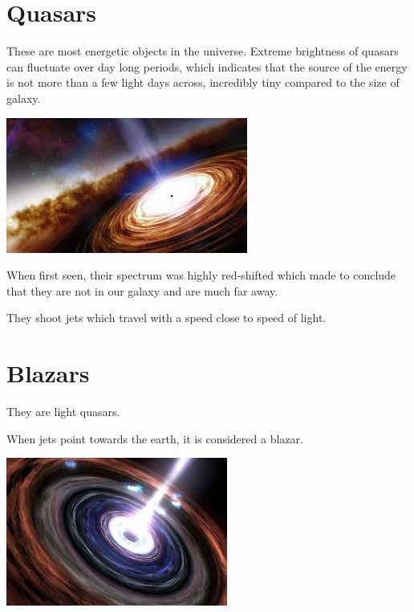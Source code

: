 \documentclass{book}
\begin{document}
\section{Quasars}
These are most energetic objects in the universe.
Extreme brightness of quasars can fluctuate over day long periods, which indicates that the source of the energy is not more than a few light days across, incredibly tiny compared to the size of galaxy.


\includegraphics{quasar.jpeg}


When first seen, their spectrum was highly red-shifted which made to conclude that they are not in our galaxy and are much far away.

They shoot jets which travel with a speed close to speed of light.


\section{Blazars}
They are light quasars.

When jets point towards the earth, it is considered a blazar.


\includegraphics{blazar.jpeg}
\end{document}
